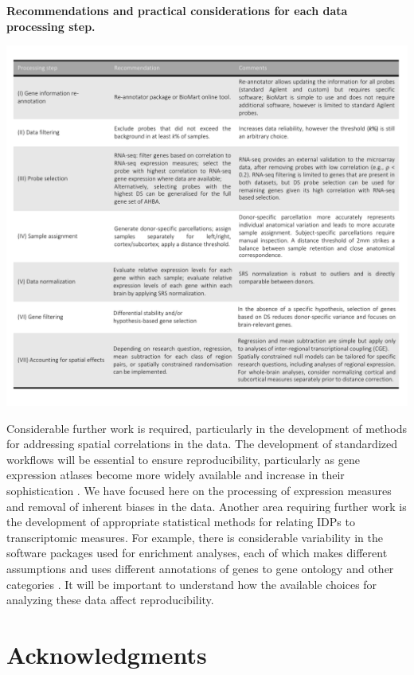 \documentclass[10pt,A4]{article}
\begin{document}
\begin{table}[h!]
\caption{\textbf{Recommendations and practical considerations for each data processing step.}}
  \centering
    \includegraphics[width=1\textwidth]{Ch4Fig9.pdf}
\label{fig:Ch4Fig9}
\end{table}

Considerable further work is required, particularly in the development of methods for addressing spatial correlations in the data. The development of standardized workflows will be essential to ensure reproducibility, particularly as gene expression atlases become more widely available and increase in their sophistication \citep{Lein2007a,Harris2010,Miller2014}. We have focused here on the processing of expression measures and removal of inherent biases in the data. Another area requiring further work is the development of appropriate statistical methods for relating IDPs to transcriptomic measures. For example, there is considerable variability in the software packages used for enrichment analyses, each of which makes different assumptions and uses different annotations of genes to gene ontology and other categories \citep{Rhee2008}. It will be important to understand how the available choices for analyzing these data affect reproducibility.

\section*{Acknowledgments}
\end{document}
